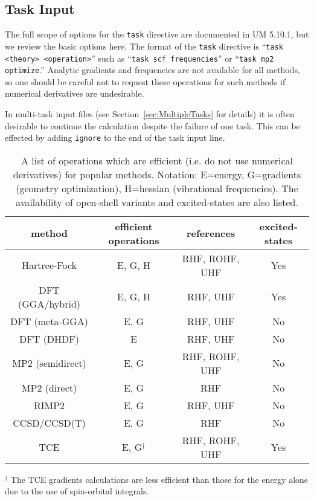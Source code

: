 \documentclass[letterpaper,12pt]{article}
\begin{document}
\newpage

\subsection{Task Input}\label{sec:TaskInput}

The full scope of options for the \texttt{task} directive are documented in UM 5.10.1, but we review the basic options here.  The format of the \texttt{task} directive is ``\texttt{task <theory> <operation>}'' such as ``\texttt{task scf frequencies}'' or ``\texttt{task mp2 optimize}.''  Analytic gradients and frequencies are not available for all methods, so one should be careful not to request these operations for such methods if numerical derivatives are undesirable.

In multi-task input files (see Section~\ref{sec:MultipleTasks} for details) it is often desirable to continue the calculation despite the failure of one task.  This can be effected by adding \texttt{ignore} to the end of the task input line.

\begin{table}[!hp]
    \label{tab:TaskOptions}
    \caption{A list of operations which are efficient (i.e. do not use numerical derivatives) for popular methods.  Notation: E=energy, G=gradients (geometry optimization), H=hessian (vibrational frequencies).  The availability of open-shell variants and excited-states are also listed.}
    \begin{tabular}{cccc}
        \hline\hline
        method           & efficient operations & references & excited-states \\
        \hline
        Hartree-Fock     & E, G, H       & RHF, ROHF, UHF & Yes \\
        DFT (GGA/hybrid) & E, G, H       & RHF, UHF       & Yes \\
        DFT (meta-GGA)   & E, G          & RHF, UHF       & No  \\
        DFT (DHDF)       & E             & RHF, UHF       & No  \\
        MP2 (semidirect) & E, G          & RHF, ROHF, UHF & No  \\
        MP2 (direct)     & E, G          & RHF            & No  \\
        RIMP2            & E, G          & RHF, UHF       & No  \\
        CCSD/CCSD(T)     & E, G          & RHF            & No  \\
        TCE              & E, G$^{\dag}$ & RHF, ROHF, UHF & Yes \\
        \hline\hline
    \end{tabular}
    $^{\dag}$ The TCE gradients calculations are less efficient than those for the energy alone due to the use of spin-orbital integrals.
\end{table}
\end{document}
